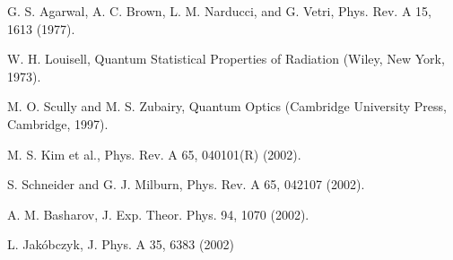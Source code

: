 \documentclass[11pt]{article}
\begin{document}
\begin{thebibliography}{3}
 G. S. Agarwal, A. C. Brown, L. M. Narducci, and G. Vetri, Phys. Rev. A 15, 1613 (1977).

 W. H. Louisell, Quantum Statistical Properties of Radiation (Wiley, New York, 1973).

M. O. Scully and M. S. Zubairy, Quantum Optics (Cambridge University Press, Cambridge, 1997).

 M. S. Kim et al., Phys. Rev. A 65, 040101(R) (2002).

 S. Schneider and G. J. Milburn, Phys. Rev. A 65, 042107 (2002).
 
A. M. Basharov, J. Exp. Theor. Phys. 94, 1070 (2002).

L. Jakóbczyk, J. Phys. A 35, 6383 (2002)
	
\end{thebibliography}
\end{document}
